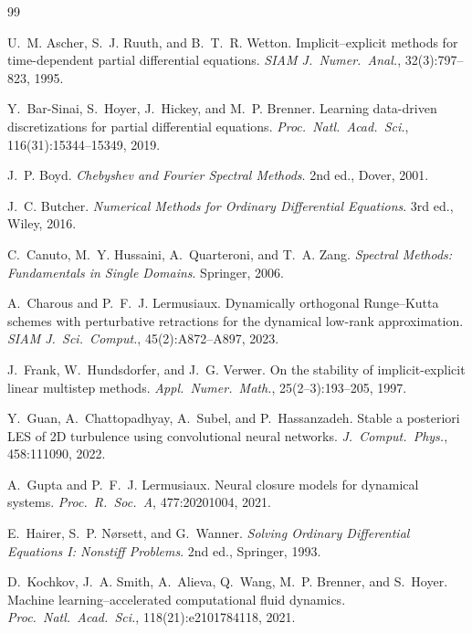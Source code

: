 \documentclass[11pt]{article}
\theoremstyle{plain}
\theoremstyle{definition}
\begin{document}

\begin{thebibliography}{99}

U.~M. Ascher, S.~J. Ruuth, and B.~T.~R. Wetton.
Implicit--explicit methods for time-dependent partial differential equations.
\emph{SIAM J.\ Numer.\ Anal.}, 32(3):797--823, 1995.

Y.~Bar-Sinai, S.~Hoyer, J.~Hickey, and M.~P. Brenner.
Learning data-driven discretizations for partial differential equations.
\emph{Proc.\ Natl.\ Acad.\ Sci.}, 116(31):15344--15349, 2019.

J.~P. Boyd. \emph{Chebyshev and Fourier Spectral Methods}. 2nd ed., Dover,
2001.

J.~C. Butcher. \emph{Numerical Methods for Ordinary Differential Equations}.
3rd ed., Wiley, 2016.

C.~Canuto, M.~Y. Hussaini, A.~Quarteroni, and T.~A. Zang.
\emph{Spectral Methods: Fundamentals in Single Domains}. Springer, 2006.

A.~Charous and P.~F.~J. Lermusiaux. Dynamically orthogonal Runge--Kutta
schemes with perturbative retractions for the dynamical low-rank
approximation. \emph{SIAM J.\ Sci.\ Comput.}, 45(2):A872--A897, 2023.

J.~Frank, W.~Hundsdorfer, and J.~G. Verwer.
On the stability of implicit-explicit linear multistep methods.
\emph{Appl.\ Numer.\ Math.}, 25(2--3):193--205, 1997.

Y.~Guan, A.~Chattopadhyay, A.~Subel, and P.~Hassanzadeh. Stable a posteriori
LES of 2D turbulence using convolutional neural networks. \emph{J.\ Comput.\
Phys.}, 458:111090, 2022.

A.~Gupta and P.~F.~J. Lermusiaux. Neural closure models for dynamical
systems. \emph{Proc.\ R.\ Soc.\ A}, 477:20201004, 2021.

E.~Hairer, S.~P. N{\o}rsett, and G.~Wanner. \emph{Solving Ordinary
Differential Equations I: Nonstiff Problems}. 2nd ed., Springer, 1993.

D.~Kochkov, J.~A. Smith, A.~Alieva, Q.~Wang, M.~P. Brenner, and S.~Hoyer.
Machine learning--accelerated computational fluid dynamics.
\emph{Proc.\ Natl.\ Acad.\ Sci.}, 118(21):e2101784118, 2021.


\end{thebibliography}
\end{document}
